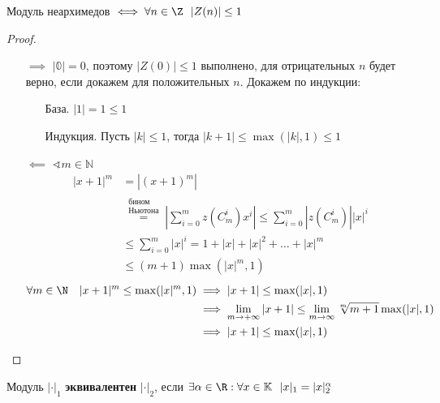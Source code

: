 \begin{theorem}
	Модуль неархимедов \(\iff \forall n \in \Z \ \ |Z(n)| \le 1\)
\end{theorem}
\begin{proof}\itemfix
	\begin{itemize}
		\item[\(\implies\)] \(|\mathbb{0}| = 0\), поэтому \(|Z(0)| \le 1\) выполнено, для отрицательных \(n\) будет верно, если докажем для положительных \(n\).
			Докажем по индукции:

			\begin{itemize}
				\item[База.] \(|1| = 1 \le 1\)
				\item[Индукция.] Пусть \(|k| \le 1\), тогда \(|k + 1| \le \max(|k|, 1) \le 1\)
			\end{itemize}
		\item[\(\impliedby\)] \(\sphericalangle m \in \mathbb{N}\)
			\begin{align}
				|x+1|^m & = |(x+1)^m|                                                              \\
				        & \stackrel{\substack{\text{бином}                                         \\ \text{Ньютона}}}{=}
				\left|\sum_{i=0}^m z\left(C_m^i\right)x^i\right| \le \sum_{i=0}^m |z(C_m^i)| |x|^i \\
				        & \le \sum_{i=0}^m |x|^i = 1 + |x| + |x|^2 + \ldots + |x|^m                \\
				        & \le (m + 1) \max(|x|^m, 1)
			\end{align}
			\begin{align}
				\forall m \in \N \quad |x+1|^m \le \max(|x|^m, 1)
				 & \implies |x+1| \le \max(|x|, 1)                                                          \\
				 & \implies \lim_{m \to +\infty} |x+1| \le \lim_{m \to \infty} \sqrt[m]{m + 1} \max(|x|, 1) \\
				 & \implies |x+1| \le \max(|x|, 1)
			\end{align}
	\end{itemize}
\end{proof}

\begin{definition}
	Модуль \(|\cdot|_1\) \textbf{эквивалентен} \(|\cdot|_2\), если
	\(\exists \alpha \in \R : \forall x \in \mathbb{K} \ \ |x|_1 = |x|_2^\alpha\)
\end{definition}

